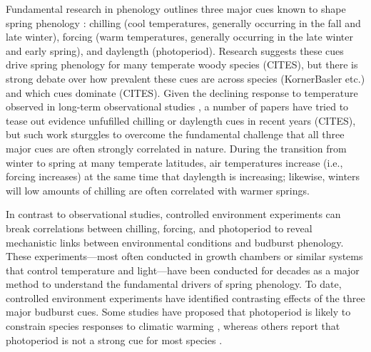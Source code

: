 \documentclass[11pt,letter]{article}
\begin{document}
\par Fundamental research in phenology outlines three major cues known to shape spring phenology \citep{chuineJTB}: chilling (cool temperatures, generally occurring in the fall and late winter), forcing (warm temperatures, generally occurring in the late winter and early spring), and daylength (photoperiod). Research suggests these cues drive spring phenology for many temperate woody species (CITES), but there is strong debate over how prevalent these cues are across species (KornerBasler etc.) and which cues dominate (CITES). Given the declining response to temperature observed in long-term observational studies \citep{fu2015}, a number of papers have tried to tease out evidence unfufilled chilling or daylength cues in recent years (CITES), but such work sturggles to overcome the fundamental challenge that all three major cues are often strongly correlated in nature. During the transition from winter to spring at many temperate latitudes, air temperatures increase (i.e., forcing increases) at the same time that daylength is increasing; likewise, winters will low amounts of chilling are often correlated with warmer springs. \\ %

\par In contrast to observational studies, controlled environment experiments can break correlations between chilling, forcing, and photoperiod to reveal mechanistic links between environmental conditions and budburst phenology. These experiments---most often conducted in growth chambers or similar systems that control temperature and light---have been conducted for decades as a major method to understand the fundamental drivers of spring phenology. To date, controlled environment experiments have identified contrasting effects of the three major budburst cues. Some studies have proposed that photoperiod is likely to constrain species responses to climatic warming \citep{Basler:2012, Caffarra:2011b,Caffarra:2011a}, whereas others report that photoperiod is not a strong cue for most species \citep{zohner2016,Laube:2014a}. 
\end{document}
